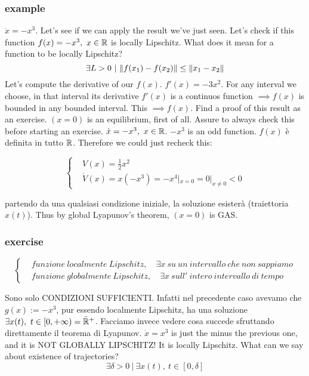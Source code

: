 \subsubsection{example}

$\dot{x}=-x^3$. Let's see if we can apply the result we've just seen. Let's check if this function $f(x)=-x^3,\ x \in \mathbb{R}$ is locally Lipschitz. What does it mean for a function to be locally Lipschitz?
\[
	\exists L > 0\ |\ \norma{f(x_1)-f(x_2)} \leq \norma{x_1-x_2}
\]
Let's compute the derivative of our $f(x)$. $f'(x) = -3x^2$. For any interval we choose, in that interval its derivative $f'(x)$ is a continuos function $\implies f(x)$ is bounded in any bounded interval. This $\implies f(x)$. Find a proof of this result as an exercise. 
$(x=0)$ is an equilibrium, first of all. Assure to always check this before starting an exercise.
$\dot{x}=-x^3,\ x \in \mathbb{R}$. $-x^3$ is an odd function. $f(x)$ è definita in tutto $\mathbb{R}$. Therefore we could just recheck this:

\[
	\left\{
	\begin{aligned}
	&V(x) = \frac{1}{2}x^2 \\
	&\dot{V}(x) = x(-x^3) = -x^4 |_{x=0} = 0 |_{x\neq 0} < 0
	\end{aligned} 
	\right.
\]	

partendo da una qualsiasi condizione iniziale, la soluzione esisterà (traiettoria $x(t)$). Thus by global Lyapunov's theorem, $(x=0)$ is GAS.

\subsubsection{exercise}

\[
	\left\{
	\begin{aligned}
	&funzione\ localmente\ Lipschitz,\quad \exists x\ su\ un\ intervallo\ che\ non\ sappiamo \\
	&funzione\ globalmente\ Lipschitz,\quad \exists x\ sull'\ intero\ intervallo\ di\ tempo
	\end{aligned} 
	\right.
\]

Sono solo CONDIZIONI SUFFICIENTI. Infatti nel precedente caso avevamo che $g(x):=-x^3$, pur essendo localmente Lipschitz, ha una soluzione $\exists x(t),\ t \in [0,+\infty) = \bar{\mathbb{R}}^+$.
Facciamo invece vedere cosa succede sfruttando direttamente il teorema di Lyapunov.
$\dot{x}=x^3$ is just the minus the previous one, and it is NOT GLOBALLY LIPSCHITZ! It is locally Lipschitz. What can we say about existence of trajectories?
\[
	\exists \delta > 0\ |\ \exists x(t),\ t \in [0,\delta]
\]

